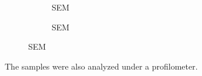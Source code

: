 \begin{figure}[ht]
\begin{subfigure}[t]{0.24\linewidth}
    	\caption{SEM}
    	\label{fig:b2d28_q28}
    \end{subfigure}
    \hfill
    \begin{subfigure}[t]{0.24\linewidth}
    	\centering
    	\caption{SEM}
    	\label{fig:b2d29_q29}
    \end{subfigure}
\end{figure}


The samples were also analyzed under a profilometer.

